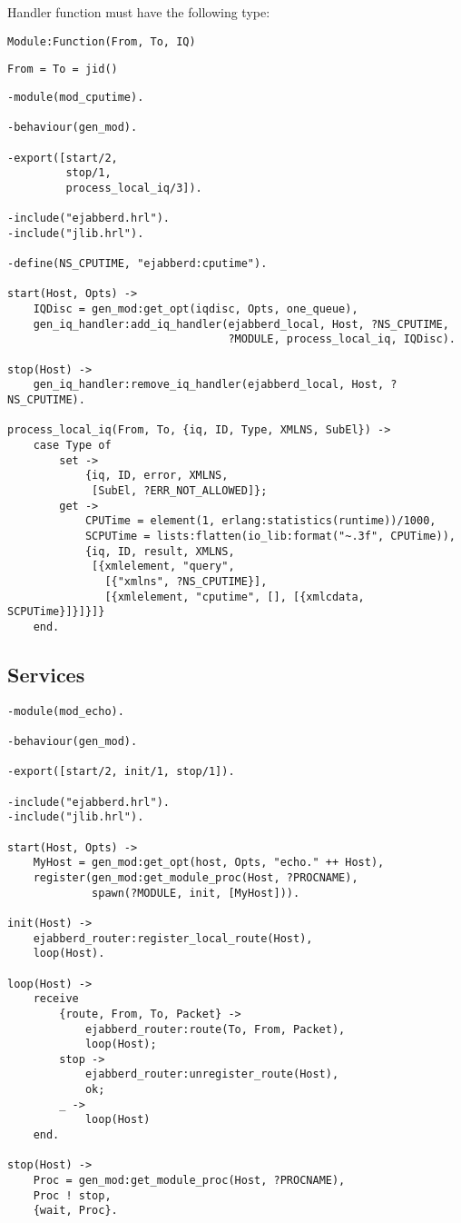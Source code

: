 \documentclass[a4paper,10pt]{article}
\begin{document}
Handler function must have the following type:
\begin{description}
\item{\verb|Module:Function(From, To, IQ)|}
\begin{verbatim}
From = To = jid()
\end{verbatim}
\end{description}



\begin{verbatim}
-module(mod_cputime).

-behaviour(gen_mod).

-export([start/2,
         stop/1,
         process_local_iq/3]).

-include("ejabberd.hrl").
-include("jlib.hrl").

-define(NS_CPUTIME, "ejabberd:cputime").

start(Host, Opts) ->
    IQDisc = gen_mod:get_opt(iqdisc, Opts, one_queue),
    gen_iq_handler:add_iq_handler(ejabberd_local, Host, ?NS_CPUTIME,
                                  ?MODULE, process_local_iq, IQDisc).

stop(Host) ->
    gen_iq_handler:remove_iq_handler(ejabberd_local, Host, ?NS_CPUTIME).

process_local_iq(From, To, {iq, ID, Type, XMLNS, SubEl}) ->
    case Type of
        set ->
            {iq, ID, error, XMLNS,
             [SubEl, ?ERR_NOT_ALLOWED]};
        get ->
            CPUTime = element(1, erlang:statistics(runtime))/1000,
            SCPUTime = lists:flatten(io_lib:format("~.3f", CPUTime)),
            {iq, ID, result, XMLNS,
             [{xmlelement, "query",
               [{"xmlns", ?NS_CPUTIME}],
               [{xmlelement, "cputime", [], [{xmlcdata, SCPUTime}]}]}]}
    end.
\end{verbatim}


\subsection{Services}
\label{services}



\begin{verbatim}
-module(mod_echo).

-behaviour(gen_mod).

-export([start/2, init/1, stop/1]).

-include("ejabberd.hrl").
-include("jlib.hrl").

start(Host, Opts) ->
    MyHost = gen_mod:get_opt(host, Opts, "echo." ++ Host),
    register(gen_mod:get_module_proc(Host, ?PROCNAME),
             spawn(?MODULE, init, [MyHost])).

init(Host) ->
    ejabberd_router:register_local_route(Host),
    loop(Host).

loop(Host) ->
    receive
        {route, From, To, Packet} ->
            ejabberd_router:route(To, From, Packet),
            loop(Host);
        stop ->
            ejabberd_router:unregister_route(Host),
            ok;
        _ ->
            loop(Host)
    end.

stop(Host) ->
    Proc = gen_mod:get_module_proc(Host, ?PROCNAME),
    Proc ! stop,
    {wait, Proc}.
\end{verbatim}
\end{document}

